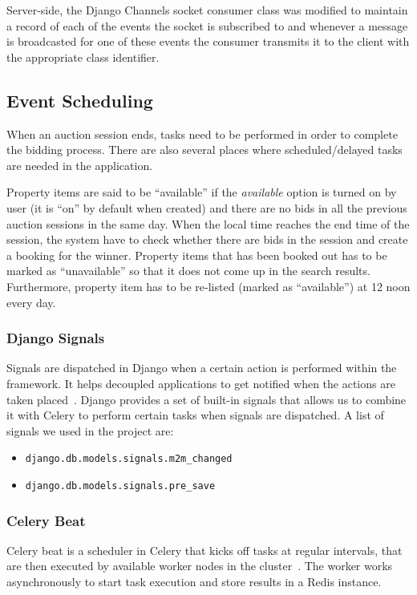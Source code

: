 Server-side, the Django Channels socket consumer class was modified to maintain
a record of each of the events the socket is subscribed to and whenever a
message is broadcasted for one of these events the consumer transmits it to
the client with the appropriate class identifier.

\subsection{Event Scheduling}
When an auction session ends, tasks need to be performed in order to complete
the bidding process. There are also several places where scheduled/delayed tasks
are needed in the application.

Property items are said to be ``available'' if the \emph{available} option is
turned on by user (it is ``on'' by default when created) and there are no bids
in all the previous auction sessions in the same day. When the local time
reaches the end time of the session, the system have to check whether there are
bids in the session and create a booking for the winner. Property items that has
been booked out has to be marked as ``unavailable'' so that it does not come up
in the search results. Furthermore, property item has to be re-listed (marked
as ``available'') at 12 noon every day.

\subsubsection{Django Signals}
Signals are dispatched in Django when a certain action is performed within the
framework. It helps decoupled applications to get notified when the actions are
taken placed~\cite{django-signals}. Django provides a set of built-in signals
that allows us to combine it with Celery to perform certain tasks when signals
are dispatched. A list of signals we used in the project are:

\begin{itemize}
  \item \texttt{django.db.models.signals.m2m\_changed}
  \item \texttt{django.db.models.signals.pre\_save}
\end{itemize}

\subsubsection{Celery Beat}
Celery beat is a scheduler in Celery that kicks off tasks at regular intervals,
that are then executed by available worker nodes in the cluster~\cite{celery-beat}.
The worker works asynchronously to start task execution and store results in
a Redis instance.

